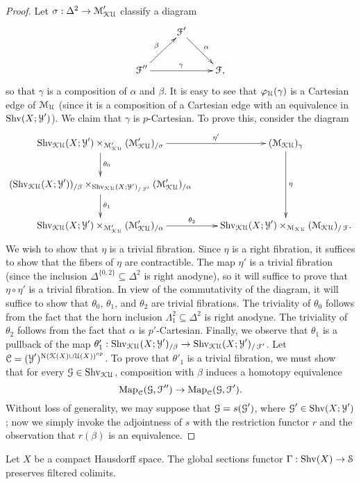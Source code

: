 \begin{proof}
Let
$\sigma: \Delta^2 \rightarrow \operatorname{\mathcal{M}}'_{{\mathcal K}{\mathcal U}}$ classify
a diagram
$$ \xymatrix{ & \calF' \ar[dr]^{\alpha} & \\
\calF'' \ar[ur]^{\beta} \ar[rr]^{\gamma} & & \calF, }$$
so that $\gamma$ is a composition of $\alpha$ and $\beta$. It is easy
to see that $\varphi_{\operatorname{\mathcal{U}}}(\gamma)$ is a Cartesian edge of $\operatorname{\mathcal{M}}_{\operatorname{\mathcal{U}}}$ (since it is a composition of a Cartesian edge with an equivalence in $\operatorname{Shv}(X; \operatorname{\mathcal{Y}}')$). We claim that $\gamma$ is $p$-Cartesian. To prove this, consider the diagram
$$ \xymatrix{ \Shv_{\calKU}(X; \calY') \times_{ \calM'_{\calKU}} (\calM'_{\calKU})_{/\sigma} \ar[d]^{\theta_0} \ar[r]^-{\eta'} & (\calM_{\calKU})_{\gamma} \ar[dd]^{\eta} \\
(\Shv_{\calKU}(X; \calY'))_{/\beta}
\times_{ \Shv_{\calKU}(X; \calY')_{/ \calF'}} (\calM'_{\calKU})_{/\alpha}
\ar[d]^{\theta_1} & \\ 
\Shv_{\calKU}(X; \calY') \times_{ \calM'_{\calKU} } (\calM'_{\calKU})_{/\alpha} \ar[r]^-{\theta_2} &
\Shv_{\calKU}(X; \calY') \times_{ \calM_{\calKU} }
(\calM_{\calKU})_{/\calF}. }$$
We wish to show that $\eta$ is a trivial fibration. Since $\eta$ is a right fibration, it suffices
to show that the fibers of $\eta$ are contractible. The map $\eta'$ is a trivial fibration
(since the inclusion $\Delta^{ \{0,2\} } \subseteq \Delta^2$ is right anodyne), so it will suffice to prove that $\eta \circ \eta'$ is a trivial fibration. In view of the commutativity of the diagram, it will suffice to show that $\theta_0$, $\theta_1$, and $\theta_2$ are trivial fibrations. The triviality of $\theta_0$ follows from the fact that the horn inclusion $\Lambda^2_1 \subseteq \Delta^2$ is right anodyne.
The triviality of $\theta_2$ follows from the fact that $\alpha$ is $p'$-Cartesian. Finally, we observe that $\theta_1$ is a pullback of the map $\theta'_1: \operatorname{Shv}_{{\mathcal K}{\mathcal U}}(X; \operatorname{\mathcal{Y}}')_{/\beta} \rightarrow
\operatorname{Shv}_{{\mathcal K}{\mathcal U}}(X; \operatorname{\mathcal{Y}}')_{/\operatorname{\mathcal{F}}'}$. Let $\operatorname{\mathcal{C}} = (\operatorname{\mathcal{Y}}')^{ \operatorname{N} (\operatorname{\mathcal{K}}(X) \cup \operatorname{\mathcal{U}}(X))^{op} }$.
To prove that $\theta'_1$ is a trivial fibration, we must show that
for every $\operatorname{\mathcal{G}} \in \operatorname{Shv}_{{\mathcal K}{\mathcal U}}$, composition with $\beta$ induces a homotopy equivalence
$$ \operatorname{{Map}}_{ \operatorname{\mathcal{C}}}( \operatorname{\mathcal{G}}, \operatorname{\mathcal{F}}'' ) \rightarrow \operatorname{{Map}}_{\operatorname{\mathcal{C}}}(\operatorname{\mathcal{G}}, \operatorname{\mathcal{F}}').$$
Without loss of generality, we may suppose that $\operatorname{\mathcal{G}} = s( \operatorname{\mathcal{G}}')$, where
$\operatorname{\mathcal{G}}' \in \operatorname{Shv}(X; \operatorname{\mathcal{Y}}')$; now we simply invoke the adjointness of $s$ with the
restriction functor $r$ and the observation that $r(\beta)$ is an equivalence.
\end{proof}

\begin{corollary}\label{compactcase}
Let $X$ be a compact Hausdorff space.
The global sections functor $\Gamma: \operatorname{Shv}(X) \rightarrow \operatorname{\mathcal{S}}$ preserves filtered colimits.
\end{corollary}

